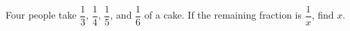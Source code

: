 Four people take $\dfrac{1}{3}$, $\dfrac{1}{4}$, $\dfrac{1}{5}$, and $\dfrac{1}{6}$ of a cake. If the remaining fraction is $\dfrac{1}{x}$, find $ x $.
